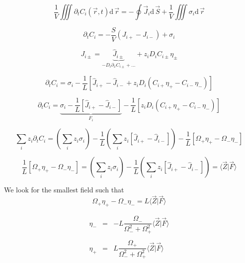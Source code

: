\documentclass[aps,12pt]{revtex4}
\begin{document}
\begin{equation}
	\dfrac{1}{V} \iiint \partial_t C_i(\vec r,t)  \mathrm{d}\, \vec r
	= - \oint  	\vec{J}_i \mathrm{d}\, \vec S + \dfrac{1}{V} \iiint \sigma_i \mathrm{d}\, \vec r
\end{equation}
 
\begin{equation}
	\partial_t C_i = -\dfrac{S}{V}(J_{i+}-J_{i-}) + \sigma_i
\end{equation}

\begin{equation}
	J_{i\pm} = \underbrace{\hat J_{i\pm}}_{-D_i \partial_x C_{i\pm}+\ldots} + z_i D_i C_{i\pm} \eta_\pm
\end{equation}

\begin{equation}
	\partial_t C_i = \sigma_i -\dfrac{1}{L} \left[ \hat J_{i+}- \hat J_{i-} + z_i D_i (C_{i+} \eta_+ - C_{i-} \eta_-) \right] 
\end{equation}

\begin{equation}
	\partial_t C_i = \underbrace{\sigma_i -\dfrac{1}{L} \left[ \hat J_{i+}- \hat J_{i-} \right]}_{F_i} - \dfrac{1}{L}  \left[ z_i D_i (C_{i+} \eta_+ - C_{i-} \eta_-) \right] 
\end{equation}


\begin{equation}
	\sum_i z_i \partial_t C_i = \left(\sum_i z_i \sigma_i\right) 
	-\dfrac{1}{L} \left( \sum_i z_i\left[ \hat J_{i+}- \hat J_{i-} \right]  \right)
	- \dfrac{1}{L}  \left[ \Omega_{+} \eta_+ - \Omega_{-} \eta_- \right] 
\end{equation}

\begin{equation}
	\dfrac{1}{L}  \left[ \Omega_{+} \eta_+ - \Omega_{-} \eta_- \right]  =
	\left(\sum_i z_i \sigma_i\right) 
	-\dfrac{1}{L} \left( \sum_i z_i\left[ \hat J_{i+}- \hat J_{i-} \right]  \right)
	= \langle \vec Z \vert \vec F \rangle
\end{equation}

 
We look for the smallest field such that 
\begin{equation}
\Omega_{+} \eta_+ - \Omega_{-} \eta_- = L \langle \vec Z \vert \vec F \rangle
\end{equation}

\begin{equation}
\begin{array}{rcl}
	\eta_- & = & - L \dfrac{\Omega_{-}}{ \Omega_{-}^2 + \Omega_{+}^2} \langle \vec Z \vert \vec F \rangle \\
	\\
 	\eta_+ & = &  L \dfrac{\Omega_{+}}{ \Omega_{-}^2 + \Omega_{+}^2} \langle \vec Z \vert \vec F \rangle \\
\end{array}
\end{equation}
\end{document}
